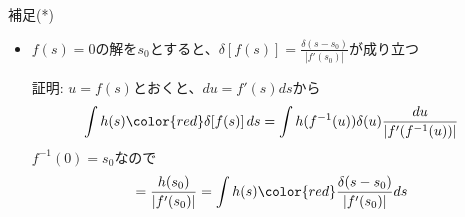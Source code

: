 
\begin{frame}[t,fragile]{補足(*)}
  \begin{itemize}
  \item $f(s)=0$の解を$s_0$とすると、$\displaystyle \delta [f(s)] = \frac{\delta(s-s_0)}{|f'(s_0)|}$が成り立つ

    証明: $u=f(s)$とおくと、$du = f'(s)ds$から
    \begin{align*}
      \int h(s) {\color{red}\delta [f(s)]} \, ds= \int h(f^{-1}(u)) \delta(u) \frac{du}{|f'(f^{-1}(u))|}
    \end{align*}
    $f^{-1}(0)=s_0$なので
    \begin{align*}
      = \frac{h(s_0)}{|f'(s_0)|} = \int h(s) {\color{red}\frac{\delta(s-s_0)}{|f'(s_0)|}} ds
    \end{align*}
  \end{itemize}
\end{frame}
